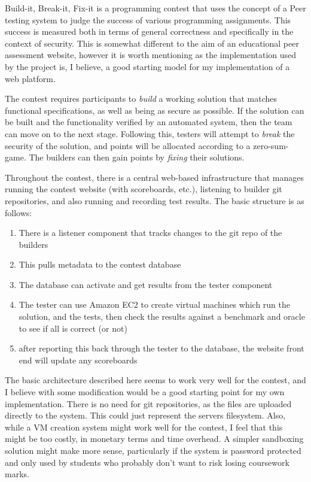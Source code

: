 \documentclass[a4paper,11pt]{report}
\begin{document}
Build-it, Break-it, Fix-it\cite{ruef_build_2016} is a programming contest that uses the concept of a Peer testing system to judge the success of various programming assignments. This success is measured both in terms of general correctness and specifically in the context of security. This is somewhat different to the aim of an educational peer assessment website, however it is worth mentioning as the implementation used by the project is, I believe, a good starting model for my implementation of a web platform.\par
The contest requires participants to \textit{build} a working solution that matches functional specifications, as well as being as secure as possible. If the solution can be built and the functionality verified by an automated system, then the team can move on to the next stage. Following this, testers will attempt to \textit{break} the security of the solution, and points will be allocated according to a zero-sum-game. The builders can then gain points by \textit{fixing} their solutions.\par
Throughout the contest, there is a central web-based infrastructure that manages running the contest website (with scoreboards, etc.), listening to builder git repositories, and also running and recording test results. The basic structure is as follows:
\begin{enumerate}
 \item There is a listener component that tracks changes to the git repo of the builders
 \item This pulls metadata to the contest database
 \item The database can activate and get results from the tester component
 \item The tester can use Amazon EC2 to create virtual machines which run the solution, and the tests, then check the results against a benchmark and oracle to see if all is correct (or not)
 \item after reporting this back through the tester to the database, the website front end will update any scoreboards
\end{enumerate}
The basic architecture described here seems to work very well for the contest, and I believe with some modification would be a good starting point for my own implementation. There is no need for git repositories, as the files are uploaded directly to the system. This could just represent the servers filesystem. Also, while a VM creation system might work well for the contest, I feel that this might be too costly, in monetary terms and time overhead. A simpler sandboxing solution might make more sense, particularly if the system is password protected and only used by students who probably don't want to risk losing coursework marks.
\end{document}
